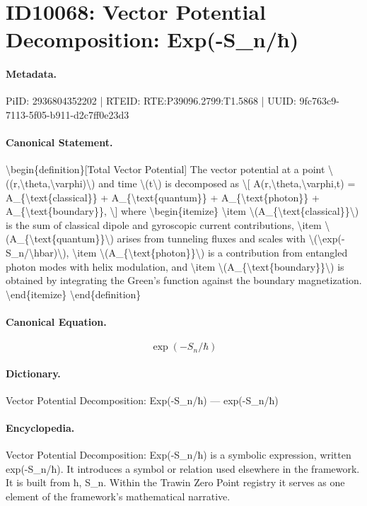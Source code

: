 \section*{ID10068: Vector Potential Decomposition: Exp(-S\_n/ħ)}
\paragraph{Metadata.}
PiID: 2936804352202 | RTEID: RTE:P39096.2799:T1.5868 | UUID: 9fc763c9-7113-5f05-b911-d2c7ff0e23d3

\paragraph{Canonical Statement.}
\textbackslash{}begin\{definition\}[Total Vector Potential] The vector potential at a point \textbackslash{}((r,\textbackslash{}theta,\textbackslash{}varphi)\textbackslash{}) and time \textbackslash{}(t\textbackslash{}) is decomposed as \textbackslash{}[ A(r,\textbackslash{}theta,\textbackslash{}varphi,t) = A\_\{\textbackslash{}text\{classical\}\} + A\_\{\textbackslash{}text\{quantum\}\} + A\_\{\textbackslash{}text\{photon\}\} + A\_\{\textbackslash{}text\{boundary\}\}, \textbackslash{}] where \textbackslash{}begin\{itemize\} \textbackslash{}item \textbackslash{}(A\_\{\textbackslash{}text\{classical\}\}\textbackslash{}) is the sum of classical dipole and gyroscopic current contributions, \textbackslash{}item \textbackslash{}(A\_\{\textbackslash{}text\{quantum\}\}\textbackslash{}) arises from tunneling fluxes and scales with \textbackslash{}(\textbackslash{}exp(-S\_n/\textbackslash{}hbar)\textbackslash{}), \textbackslash{}item \textbackslash{}(A\_\{\textbackslash{}text\{photon\}\}\textbackslash{}) is a contribution from entangled photon modes with helix modulation, and \textbackslash{}item \textbackslash{}(A\_\{\textbackslash{}text\{boundary\}\}\textbackslash{}) is obtained by integrating the Green’s function against the boundary magnetization. \textbackslash{}end\{itemize\} \textbackslash{}end\{definition\}

\paragraph{Canonical Equation.}
\[
\exp(-S_n/\hbar)
\]

\paragraph{Dictionary.}
Vector Potential Decomposition: Exp(-S\_n/ħ) — exp(-S\_n/ħ)

\paragraph{Encyclopedia.}
Vector Potential Decomposition: Exp(-S\_n/ħ) is a symbolic expression, written exp(-S\_n/ħ). It introduces a symbol or relation used elsewhere in the framework. It is built from ħ, S\_n. Within the Trawin Zero Point registry it serves as one element of the framework's mathematical narrative.
